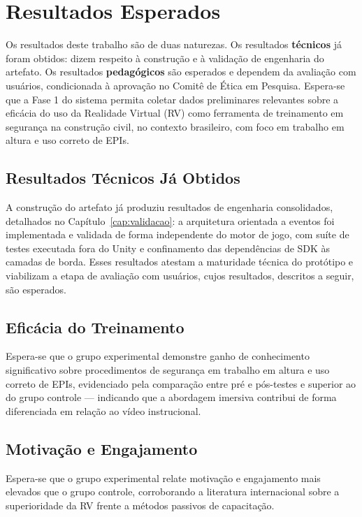 \chapter{Resultados Esperados}
\label{cap:resultados}

Os resultados deste trabalho são de duas naturezas. Os resultados \textbf{técnicos} já foram obtidos: dizem respeito à construção e à validação de engenharia do artefato. Os resultados \textbf{pedagógicos} são esperados e dependem da avaliação com usuários, condicionada à aprovação no Comitê de Ética em Pesquisa. Espera-se que a Fase 1 do sistema permita coletar dados preliminares relevantes sobre a eficácia do uso da Realidade Virtual (RV) como ferramenta de treinamento em segurança na construção civil, no contexto brasileiro, com foco em trabalho em altura e uso correto de EPIs.

\section{Resultados Técnicos Já Obtidos}

A construção do artefato já produziu resultados de engenharia consolidados, detalhados no Capítulo~\ref{cap:validacao}: a arquitetura orientada a eventos foi implementada e validada de forma independente do motor de jogo, com suíte de testes executada fora do Unity e confinamento das dependências de SDK às camadas de borda. Esses resultados atestam a maturidade técnica do protótipo e viabilizam a etapa de avaliação com usuários, cujos resultados, descritos a seguir, são esperados.

\section{Eficácia do Treinamento}

Espera-se que o grupo experimental demonstre ganho de conhecimento significativo sobre procedimentos de segurança em trabalho em altura e uso correto de EPIs, evidenciado pela comparação entre pré e pós-testes e superior ao do grupo controle --- indicando que a abordagem imersiva contribui de forma diferenciada em relação ao vídeo instrucional.

\section{Motivação e Engajamento}

Espera-se que o grupo experimental relate motivação e engajamento mais elevados que o grupo controle, corroborando a literatura internacional sobre a superioridade da RV frente a métodos passivos de capacitação.

